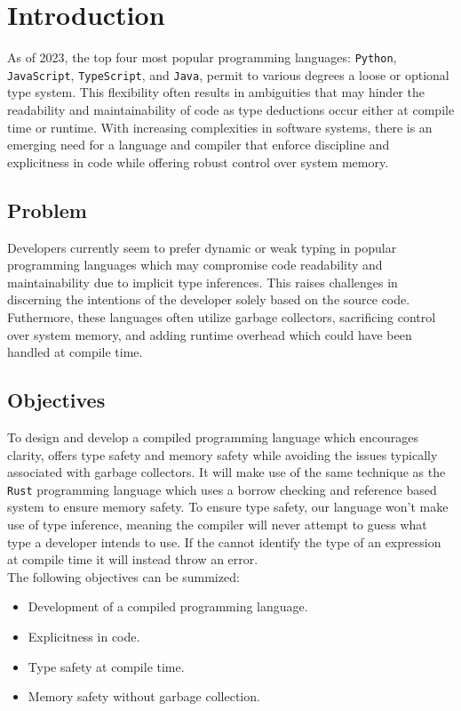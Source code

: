 \section{Introduction}
\label{sec:ProblemStatement}

As of 2023, the top four most popular programming languages: \texttt{Python},
\texttt{JavaScript},
\texttt{TypeScript}, and \texttt{Java}, permit to various degrees a loose or optional type
system\cite{STACK}. This flexibility often results in ambiguities that may hinder the
readability and maintainability of code as type deductions occur either at compile
time or runtime. With increasing complexities in software systems, there is an
emerging need for a language and compiler that enforce discipline and explicitness in
code while offering robust control over system memory.

\subsection{Problem}

Developers currently seem to prefer dynamic or weak typing in popular programming
languages\cite{STACK} which may compromise code readability and maintainability due to implicit
type inferences. This raises challenges in discerning the intentions of the developer
solely based on the source code. Futhermore, these languages often utilize garbage
collectors, sacrificing control over system memory, and adding runtime overhead which
could have been handled at compile time.

\subsection{Objectives}
\label{sec:Objectives}

To design and develop a compiled programming language which encourages clarity, offers
type safety and memory safety while avoiding the issues typically associated with
garbage collectors. It will make use of the same technique as the \texttt{Rust} programming
language which uses a borrow checking and reference based system to ensure memory
safety\cite{RUST}. To ensure type safety, our language won't make use of type
inference, meaning the compiler will never attempt to guess what type a developer
intends to use. If the \typeChecker{} cannot identify the type of an expression at
compile time it will instead throw an error. \\

The following objectives can be summized:

\begin{itemize}
  \item Development of a compiled programming language.
  \item Explicitness in code.
  \item Type safety at compile time.
  \item Memory safety without garbage collection.
\end{itemize}
